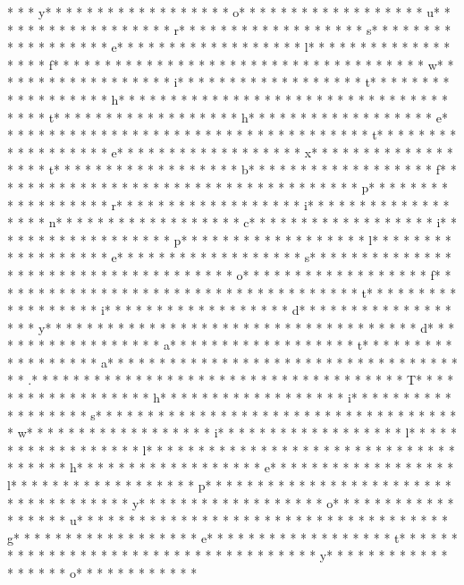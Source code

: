 * *  * y* * *  * * *  * * *  *  * * *  *  * * *  * o* * *  * * *  * * *  *  * * *  *  * * *  * u* * *  * * *  * * *  *  * * *  *  * * *  * r* * *  * * *  * * *  *  * * *  *  * * *  * s* * *  * * *  * * *  *  * * *  *  * * *  * e* * *  * * *  * * *  *  * * *  *  * * *  * l* * *  * * *  * * *  *  * * *  *  * * *  * f* * *  * * *  * * *  *  * * *  *  * * *  *  * * *  * * *  * * *  *  * * *  *  * * *  * w* * *  * * *  * * *  *  * * *  *  * * *  * i* * *  * * *  * * *  *  * * *  *  * * *  * t* * *  * * *  * * *  *  * * *  *  * * *  * h* * *  * * *  * * *  *  * * *  *  * * *  *  * * *  * * *  * * *  *  * * *  *  * * *  * t* * *  * * *  * * *  *  * * *  *  * * *  * h* * *  * * *  * * *  *  * * *  *  * * *  * e* * *  * * *  * * *  *  * * *  *  * * *  *  * * *  * * *  * * *  *  * * *  *  * * *  * t* * *  * * *  * * *  *  * * *  *  * * *  * e* * *  * * *  * * *  *  * * *  *  * * *  * x* * *  * * *  * * *  *  * * *  *  * * *  * t* * *  * * *  * * *  *  * * *  *  * * *  * b* * *  * * *  * * *  *  * * *  *  * * *  * f* * *  * * *  * * *  *  * * *  *  * * *  * {* * *  * * *  * * *  *  * * *  *  * * *  * p* * *  * * *  * * *  *  * * *  *  * * *  * r* * *  * * *  * * *  *  * * *  *  * * *  * i* * *  * * *  * * *  *  * * *  *  * * *  * n* * *  * * *  * * *  *  * * *  *  * * *  * c* * *  * * *  * * *  *  * * *  *  * * *  * i* * *  * * *  * * *  *  * * *  *  * * *  * p* * *  * * *  * * *  *  * * *  *  * * *  * l* * *  * * *  * * *  *  * * *  *  * * *  * e* * *  * * *  * * *  *  * * *  *  * * *  * s* * *  * * *  * * *  *  * * *  *  * * *  *  * * *  * * *  * * *  *  * * *  *  * * *  * o* * *  * * *  * * *  *  * * *  *  * * *  * f* * *  * * *  * * *  *  * * *  *  * * *  *  * * *  * * *  * * *  *  * * *  *  * * *  * t* * *  * * *  * * *  *  * * *  *  * * *  * i* * *  * * *  * * *  *  * * *  *  * * *  * d* * *  * * *  * * *  *  * * *  *  * * *  * y* * *  * * *  * * *  *  * * *  *  * * *  *  * * *  * * *  * * *  *  * * *  *  * * *  * d* * *  * * *  * * *  *  * * *  *  * * *  * a* * *  * * *  * * *  *  * * *  *  * * *  * t* * *  * * *  * * *  *  * * *  *  * * *  * a* * *  * * *  * * *  *  * * *  *  * * *  * }* * *  * * *  * * *  *  * * *  *  * * *  * .* * *  * * *  * * *  *  * * *  *  * * *  *  * * *  * * *  * * *  *  * * *  *  * * *  * T* * *  * * *  * * *  *  * * *  *  * * *  * h* * *  * * *  * * *  *  * * *  *  * * *  * i* * *  * * *  * * *  *  * * *  *  * * *  * s* * *  * * *  * * *  *  * * *  *  * * *  *  * * *  * * *  * * *  *  * * *  *  * * *  * w* * *  * * *  * * *  *  * * *  *  * * *  * i* * *  * * *  * * *  *  * * *  *  * * *  * l* * *  * * *  * * *  *  * * *  *  * * *  * l* * *  * * *  * * *  *  * * *  *  * * *  *  * * *  * * *  * * *  *  * * *  *  * * *  * h* * *  * * *  * * *  *  * * *  *  * * *  * e* * *  * * *  * * *  *  * * *  *  * * *  * l* * *  * * *  * * *  *  * * *  *  * * *  * p* * *  * * *  * * *  *  * * *  *  * * *  *  * * *  * * *  * * *  *  * * *  *  * * *  * y* * *  * * *  * * *  *  * * *  *  * * *  * o* * *  * * *  * * *  *  * * *  *  * * *  * u* * *  * * *  * * *  *  * * *  *  * * *  *  * * *  * * *  * * *  *  * * *  *  * * *  * g* * *  * * *  * * *  *  * * *  *  * * *  * e* * *  * * *  * * *  *  * * *  *  * * *  * t* * *  * * *  * * *  *  * * *  *  * * *  *  * * *  * * *  * * *  *  * * *  *  * * *  * y* * *  * * *  * * *  *  * * *  *  * * *  * o* * *  * * *  * * *  *  * * 